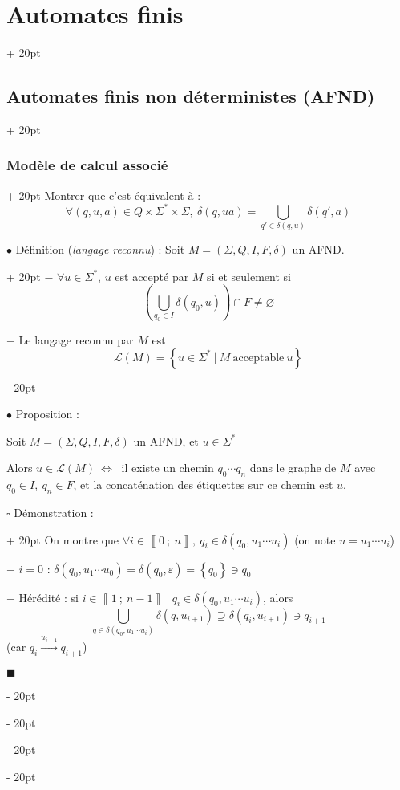 \documentclass[a4paper, 12pt, twoside]{article}
\newcommand{\nset}[2]{\left\llbracket #1\ ;\ #2 \right\rrbracket}
\newcommand{\lr}[1]{\left( #1 \right)}
\newcommand{\set}[1]{\left\{ #1 \right\}}
\newcommand{\ssi}{\ \Leftrightarrow \ }
\newcommand{\ind}[1][20pt]{\advance\leftskip + #1}
\newcommand{\deind}[1][20pt]{\advance\leftskip - #1}
\newenvironment{indt}[2][20pt]{#2 \par \ind[#1]}{\par \deind} %
\newenvironment{proof}[1][{Démonstration :}]{\begin{indt}{$\square$ #1}}{$\blacksquare$ \end{indt}}
\begin{document}
\begin{indt}{\section{Automates finis}}
\begin{indt}{\subsection{Automates finis non déterministes (AFND)}}
\begin{indt}{\subsubsection{Modèle de calcul associé}}
                 Montrer que c'est équivalent à :
                \[
                    \forall (q, u, a) \in Q \times \Sigma^* \times \Sigma,\
                    \delta(q, ua) = \bigcup_{q' \in \delta(q, u)} \delta(q', a)
                \]

                \vspace{12pt}
                
                \begin{indt}{$\bullet$ Définition (\emph{langage reconnu}) : Soit $M = (\Sigma, Q, I, F, \delta)$ un AFND.}
                    $-$ $\forall u \in \Sigma^*$, $u$ est accepté par $M$ si et seulement si
                    \[
                        \lr{\bigcup_{q_0 \in I} \delta(q_0, u)} \cap F \neq \varnothing
                    \]

                    $-$ Le langage reconnu par $M$ est
                    \[
                        \mathcal L(M) = \set{u \in \Sigma^*\ |\ M\ \text{acceptable}\ u}
                    \]
                \end{indt}

                \vspace{12pt}
                
                $\bullet$ Proposition :
                \begin{emphBox}
                    Soit $M = (\Sigma, Q, I, F, \delta)$ un AFND, et $u \in \Sigma^*$

                    Alors $u \in \mathcal L(M) \ssi$ il existe un chemin $q_0 \cdots q_n$ dans le graphe de $M$ avec $q_0 \in I,\ q_n \in F$, et la concaténation des étiquettes sur ce chemin est $u$.
                \end{emphBox}

                \vspace{6pt}
                
                \begin{proof}
                    \boxed{\Leftarrow} On montre que $\forall i \in \nset 0 n,\ q_i \in \delta(q_0, u_1 \cdots u_i)$ (on note $u = u_1 \cdots u_i$)

                    $-$ $i = 0$ : $\delta(q_0, u_1 \cdots u_0) = \delta(q_0, \varepsilon) = \set{q_0} \ni q_0$

                    $-$ Hérédité : si $i \in \nset 1 {n - 1}\ |\ q_i \in \delta(q_0, u_1 \cdots u_i)$, alors
                    \[
                        \bigcup_{q \in \delta(q_0, u_1 \cdots u_i)} \delta(q, u_{i + 1}) \supseteq \delta(q_i, u_{i + 1}) \ni q_{i + 1}
                    \]
                    (car $q_i \overset{u_{i + 1}}\longrightarrow q_{i + 1}$)


\end{proof}
\end{indt}
\end{indt}
\end{indt}
\end{document}
